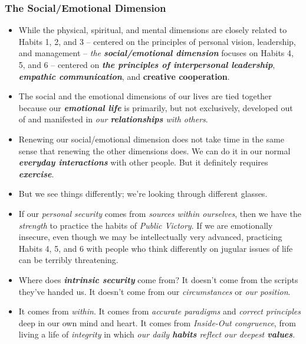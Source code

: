 \documentclass[11pt]{article}
\begin{document}
\subsubsection{The Social/Emotional Dimension}
\begin{itemize}
\item While the physical, spiritual, and mental dimensions are closely related to Habits 1, 2, and 3 -- centered on the principles of personal vision, leadership, and management -- \emph{the \textbf{social/emotional dimension}} focuses on Habits 4, 5, and 6 -- centered on \emph{\textbf{the principles of interpersonal leadership}}, \emph{\textbf{empathic communication}}, and \textbf{creative cooperation}.

\item The social and the emotional dimensions of our lives are tied together because our \emph{\textbf{emotional life}} is primarily, but not exclusively, developed out of and manifested in \emph{our \textbf{relationships} with others}.

\item Renewing our social/emotional dimension does not take time in the same sense that renewing the other dimensions does. We can do it in our normal \emph{\textbf{everyday interactions}} with other people. But it definitely requires \emph{\textbf{exercise}}. 

\item But we see things differently; we're looking through different glasses.

\item If our \emph{personal security} comes from \emph{sources within ourselves}, then we have the \emph{strength} to practice the habits of \emph{Public Victory}. If we are emotionally insecure, even though we may be intellectually very advanced, practicing Habits 4, 5, and 6 with people who think differently on jugular issues of life can be terribly threatening.

\item Where does \emph{\textbf{intrinsic security}} come from? It doesn't come from the scripts they've handed us. It doesn't come from our \emph{circumstances} or \emph{our position}.

\item It comes from \emph{within}. It comes from \emph{accurate paradigms} and \emph{correct principles} deep in our own mind and heart. It comes from \emph{Inside-Out congruence}, from living a life of \emph{integrity} in which \emph{our daily \textbf{habits} reflect our deepest \textbf{values}}.


\end{itemize}
\end{document}
